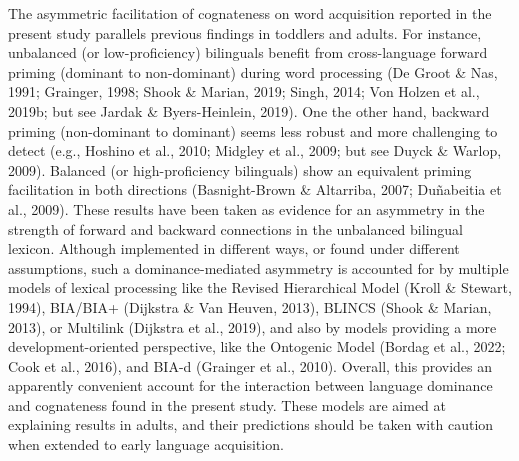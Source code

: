 \documentclass[
  12pt,
  b5paperpaper,
  twoside]{scrreprt}
\begin{document}
The asymmetric facilitation of cognateness on word acquisition reported
in the present study parallels previous findings in toddlers and adults.
For instance, unbalanced (or low-proficiency) bilinguals benefit from
cross-language forward priming (dominant to non-dominant) during word
processing (De Groot \& Nas, 1991; Grainger, 1998; Shook \& Marian,
2019; Singh, 2014; Von Holzen et al., 2019b; but see Jardak \&
Byers-Heinlein, 2019). One the other hand, backward priming
(non-dominant to dominant) seems less robust and more challenging to
detect (e.g., Hoshino et al., 2010; Midgley et al., 2009; but see Duyck
\& Warlop, 2009). Balanced (or high-proficiency bilinguals) show an
equivalent priming facilitation in both directions (Basnight-Brown \&
Altarriba, 2007; Duñabeitia et al., 2009). These results have been taken
as evidence for an asymmetry in the strength of forward and backward
connections in the unbalanced bilingual lexicon. Although implemented in
different ways, or found under different assumptions, such a
dominance-mediated asymmetry is accounted for by multiple models of
lexical processing like the Revised Hierarchical Model (Kroll \&
Stewart, 1994), BIA/BIA+ (Dijkstra \& Van Heuven, 2013), BLINCS (Shook
\& Marian, 2013), or Multilink (Dijkstra et al., 2019), and also by
models providing a more development-oriented perspective, like the
Ontogenic Model (Bordag et al., 2022; Cook et al., 2016), and BIA-d
(Grainger et al., 2010). Overall, this provides an apparently convenient
account for the interaction between language dominance and cognateness
found in the present study. These models are aimed at explaining results
in adults, and their predictions should be taken with caution when
extended to early language acquisition.
\end{document}
